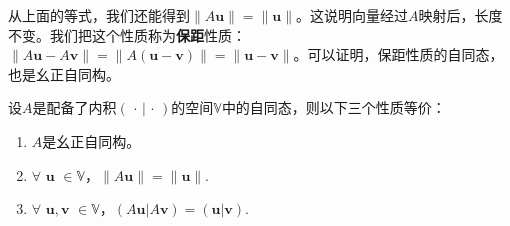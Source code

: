\documentclass[12pt,UTF8]{ctexbook}
\begin{document}
从上面的等式，我们还能得到$ \| A\mathbf{u}\| = \|\mathbf{u}\|$。这说明向量经过$A$映射后，长度不变。我们把这个性质称为\textbf{保距}性质：$ \| A\mathbf{u} - A\mathbf{v}\| = \|A(\mathbf{u} - \mathbf{v})\| = \|\mathbf{u} - \mathbf{v}\|$。可以证明，保距性质的自同态，也是幺正自同构。
\begin{pp}\label{pp:8_8_1}
设$A$是配备了内积$(\,\cdot\, | \,\cdot\,)$的空间$\mathbb{V}$中的自同态，则以下三个性质等价：
\begin{enumerate}[label=\alph*.]
    \item $A$是幺正自同构。
    \item $\forall \,\, \mathbf{u}\,\, \in \mathbb{V}$，$ \| A\mathbf{u}\| = \|\mathbf{u}\|.$
    \item $\forall \,\, \mathbf{u}, \mathbf{v} \,\, \in \mathbb{V}$，$ (A\mathbf{u} | A\mathbf{v}) = (\mathbf{u}|\mathbf{v}).$
\end{enumerate}
\end{pp}
\end{document}
